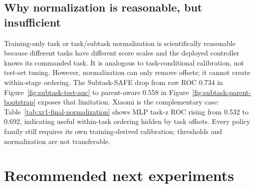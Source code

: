 \documentclass[11pt,a4paper]{article}
\begin{document}
\subsection{Why normalization is reasonable, but insufficient}
Training-only task or task/subtask normalization is scientifically reasonable
because different tasks have different score scales and the deployed
controller knows its commanded task. It is analogous to task-conditional
calibration, not test-set tuning. However, normalization can only remove
offsets; it cannot create within-stage ordering. The Subtask-SAFE drop from raw
ROC 0.734 in Figure~\ref{fig:subtask-test-auc} to parent-aware 0.558 in
Figure~\ref{fig:subtask-parent-bootstrap} exposes that limitation. Xiaomi is
the complementary case: Table~\ref{tab:xr1-final-normalization} shows MLP
task-z ROC rising from 0.532 to 0.692, indicating useful within-task ordering
hidden by task offsets. Every policy family still requires its own
training-derived calibration; thresholds and normalization are not
transferable.

\section{Recommended next experiments}
\end{document}
